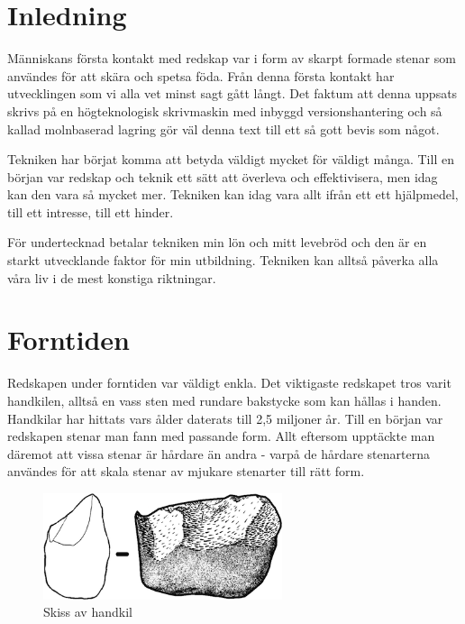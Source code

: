 \documentclass[a4paper,12pt,fleqn]{article}
\begin{document}
\pagestyle{fancy}

\fancyhead{} %


\section{Inledning}

Människans första kontakt med redskap var i form av skarpt formade stenar som användes för att skära och spetsa föda. Från denna första kontakt har utvecklingen som vi alla vet minst sagt gått långt. Det faktum att denna uppsats skrivs på en högteknologisk skrivmaskin med inbyggd versionshantering och så kallad molnbaserad lagring gör väl denna text till ett så gott bevis som något. 

Tekniken har börjat komma att betyda väldigt mycket för väldigt många. Till en början var redskap och teknik ett sätt att överleva och effektivisera, men idag kan den vara så mycket mer. Tekniken kan idag vara allt ifrån ett ett hjälpmedel, till ett intresse, till ett hinder. 

För undertecknad betalar tekniken min lön och mitt levebröd och den är en starkt utvecklande faktor för min utbildning. Tekniken kan alltså påverka alla våra liv i de mest konstiga riktningar. 

\newpage

\section{Forntiden}

Redskapen under forntiden var väldigt enkla. Det viktigaste redskapet tros varit handkilen, alltså en vass sten med rundare bakstycke som kan hållas i handen. Handkilar har hittats vars ålder daterats till 2,5 miljoner år. Till en början var redskapen stenar man fann med passande form. Allt eftersom upptäckte man däremot att vissa stenar är hårdare än andra - varpå de hårdare stenarterna användes för att skala stenar av mjukare stenarter till rätt form. 

\begin{figure}[ht!]
\centering
\includegraphics[width=70mm]{handkil.png}
\caption{Skiss av handkil}
\label{handkil}
\end{figure}
\end{document}

